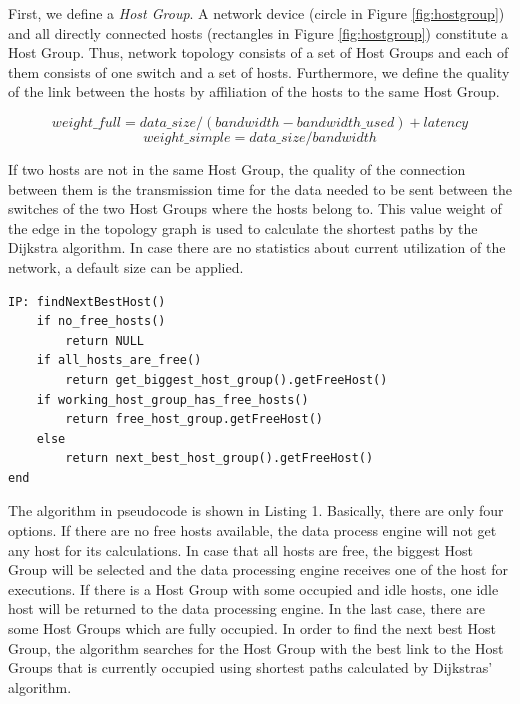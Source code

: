 First, we define a \textit{Host Group}. A network device (circle in Figure \ref{fig:hostgroup}) and all
directly connected hosts (rectangles in Figure \ref{fig:hostgroup}) constitute a Host Group.
Thus, network topology consists of a set of Host Groups and each of them consists of one switch and
a set of hosts. Furthermore, we define the quality of the link between the hosts by affiliation of
the hosts to the same Host Group.

\begin{equation}
    weight\_full = data\_size / (bandwidth - bandwidth\_used) + latency
\end{equation}
\begin{equation}
    weight\_simple = data\_size / bandwidth
\end{equation}

If two hosts are not in the same Host Group, the quality of the connection between them is the
transmission time for the data needed to be sent between the switches of the two Host Groups where
the hosts belong to. This value weight of the edge in the topology graph is used to calculate the
shortest paths by the Dijkstra algorithm. In case there are no statistics about current utilization
of the network, a default size can be applied.\\

\begin{lstlisting}[caption=Algorithm of finding free hosts based on Host Group concept]
IP: findNextBestHost()
    if no_free_hosts()
        return NULL
    if all_hosts_are_free()
        return get_biggest_host_group().getFreeHost()
    if working_host_group_has_free_hosts()
        return free_host_group.getFreeHost()
    else
        return next_best_host_group().getFreeHost()
end
\end{lstlisting}

The algorithm in pseudocode is shown in Listing 1. Basically, there are only four options. If
there are no free hosts available, the data process engine will not get any host for its
calculations. In case that all hosts are free, the biggest Host Group will be selected and the data
processing engine receives one of the host for executions. If there is a Host Group with some
occupied and idle hosts, one idle host will be returned to the data processing engine. In the last
case, there are some Host Groups which are fully occupied. In order to find the next best Host
Group, the algorithm searches for the Host Group with the best link to the Host Groups that is
currently occupied using shortest paths calculated by Dijkstras’ algorithm.

